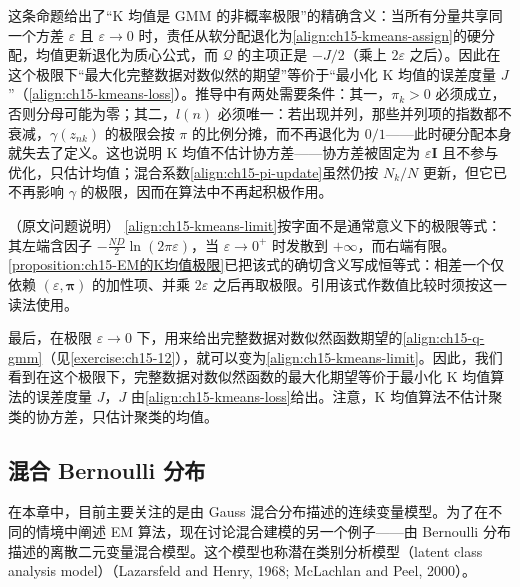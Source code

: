 \documentclass[../../main.tex]{subfiles}
\begin{document}
\begin{remark}
这条命题给出了“K 均值是 GMM 的非概率极限”的精确含义：当所有分量共享同一个方差 $\varepsilon$ 且 $\varepsilon\to0$ 时，责任从软分配退化为\eqref{align:ch15-kmeans-assign}的硬分配，均值更新退化为质心公式，而 $\mathcal{Q}$ 的主项正是 $-J/2$（乘上 $2\varepsilon$ 之后）。因此在这个极限下“最大化完整数据对数似然的期望”等价于“最小化 K 均值的误差度量 $J$”（\eqref{align:ch15-kmeans-loss}）。推导中有两处需要条件：其一，$\pi_k>0$ 必须成立，否则分母可能为零；其二，$l(n)$ 必须唯一：若出现并列，那些并列项的指数都不衰减，$\gamma(z_{nk})$ 的极限会按 $\pi$ 的比例分摊，而不再退化为 $0/1$——此时硬分配本身就失去了定义。这也说明 K 均值不估计协方差——协方差被固定为 $\varepsilon\bm{I}$ 且不参与优化，只估计均值；混合系数\eqref{align:ch15-pi-update}虽然仍按 $N_k/N$ 更新，但它已不再影响 $\gamma$ 的极限，因而在算法中不再起积极作用。
\end{remark}

\begin{remark}（原文问题说明）
\eqref{align:ch15-kmeans-limit}按字面不是通常意义下的极限等式：其左端含因子 $-\frac{ND}{2}\ln(2\pi\varepsilon)$，当 $\varepsilon\to0^{+}$ 时发散到 $+\infty$，而右端有限。\cref{proposition:ch15-EM的K均值极限}已把该式的确切含义写成恒等式：相差一个仅依赖 $(\varepsilon,\bm{\pi})$ 的加性项、并乘 $2\varepsilon$ 之后再取极限。引用该式作数值比较时须按这一读法使用。
\end{remark}

最后，在极限 $\varepsilon\rightarrow0$ 下，用来给出完整数据对数似然函数期望的\eqref{align:ch15-q-gmm}（见\cref{exercise:ch15-12}），就可以变为\eqref{align:ch15-kmeans-limit}。因此，我们看到在这个极限下，完整数据对数似然函数的最大化期望等价于最小化 K 均值算法的误差度量 $J$，$J$ 由\eqref{align:ch15-kmeans-loss}给出。注意，K 均值算法不估计聚类的协方差，只估计聚类的均值。

\subsection{混合 Bernoulli 分布}\label{subsection:ch15-混合bernoulli}

在本章中，目前主要关注的是由 Gauss 混合分布描述的连续变量模型。为了在不同的情境中阐述 EM 算法，现在讨论混合建模的另一个例子——由 Bernoulli 分布描述的离散二元变量混合模型。这个模型也称潜在类别分析模型（latent class analysis model）（Lazarsfeld and Henry, 1968; McLachlan and Peel, 2000）。
\end{document}
